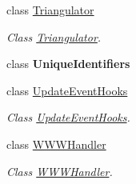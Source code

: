 \begin{DoxyCompactItemize}
class \hyperlink{class_lerp2_a_p_i_1_1_utility_1_1_triangulator}{Triangulator}
\begin{DoxyCompactList}\small\item\em Class \hyperlink{class_lerp2_a_p_i_1_1_utility_1_1_triangulator}{Triangulator}. \end{DoxyCompactList}\item 
class {\bfseries Unique\+Identifiers}
\item 
class \hyperlink{class_lerp2_a_p_i_1_1_utility_1_1_update_event_hooks}{Update\+Event\+Hooks}
\begin{DoxyCompactList}\small\item\em Class \hyperlink{class_lerp2_a_p_i_1_1_utility_1_1_update_event_hooks}{Update\+Event\+Hooks}. \end{DoxyCompactList}\item 
class \hyperlink{class_lerp2_a_p_i_1_1_utility_1_1_w_w_w_handler}{W\+W\+W\+Handler}
\begin{DoxyCompactList}\small\item\em Class \hyperlink{class_lerp2_a_p_i_1_1_utility_1_1_w_w_w_handler}{W\+W\+W\+Handler}. \end{DoxyCompactList}\end{DoxyCompactItemize}
